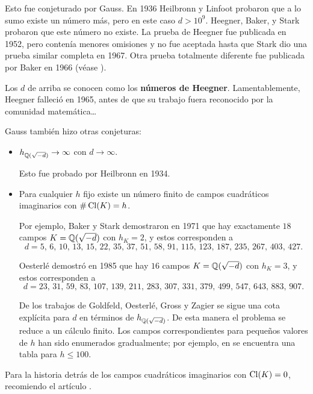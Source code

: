 Esto fue conjeturado por Gauss. En 1936 Heilbronn y Linfoot probaron que a lo
sumo existe un número más, pero en este caso $d > 10^9$.
Heegner, Baker, y Stark probaron que este número no existe. La prueba de
Heegner fue publicada en 1952, pero contenía menores omisiones y no fue aceptada
hasta que Stark dio una prueba similar completa en 1967. Otra prueba totalmente
diferente fue publicada por Baker en 1966 (véase \cite[Chapter~5]{Baker-1990}).

Los $d$ de arriba se conocen como los \textbf{números de Heegner}.
Lamentablemente, Heegner falleció en 1965, antes de que su trabajo fuera
reconocido por la comunidad matemática\dots

\vspace{1em}

\begin{samepage}
Gauss también hizo otras conjeturas:
\begin{itemize}
\item $h_{\mathbb{Q} (\sqrt{-d})} \to \infty$ con $d \to \infty$.

  Esto fue probado por Heilbronn en 1934.

\item Para cualquier $h$ fijo existe un número finito de campos cuadráticos
  imaginarios con $\# \operatorname{Cl} (K) = h$.

  Por ejemplo, Baker y Stark demostraron en 1971 que hay exactamente $18$ campos
  $K = \mathbb{Q} (\sqrt{-d})$ con $h_K = 2$, y estos corresponden a
  $$d = 5, \, 6, \, 10, \, 13, \, 15, \, 22, \, 35, \, 37, \, 51, \, 58, \, 91, \, 115, \, 123, \, 187, \, 235, \, 267, \, 403, \, 427.$$

  Oesterlé demostró en 1985 que hay $16$ campos $K = \mathbb{Q} (\sqrt{-d})$ con
  $h_K = 3$, y estos corresponden a
  $$d = 23, \, 31, \, 59, \, 83, \, 107, \, 139, \, 211, \, 283, \, 307, \, 331, \, 379, \, 499, \, 547, \, 643, \, 883, \, 907.$$

  De los trabajos de Goldfeld, Oesterlé, Gross y Zagier se sigue una cota
  explícita para $d$ en términos de $h_{\mathbb{Q} (\sqrt{-d})}$. De esta manera el
  problema se reduce a un cálculo finito. Los campos correspondientes para
  pequeños valores de $h$ han sido enumerados gradualmente; por ejemplo,
  en \cite{Watkins-2004} se encuentra una tabla para $h \le 100$.
\end{itemize}
\end{samepage}

Para la historia detrás de los campos cuadráticos imaginarios con $\operatorname{Cl} (K) = 0$,
recomiendo el artículo \cite{Goldfeld-1985}.

